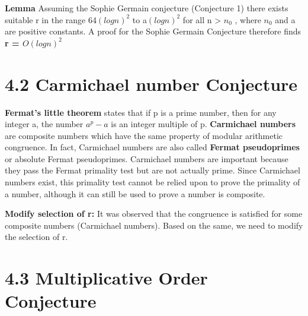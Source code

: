 \documentclass[a4paper,12pt]{article}
\begin{document}
\begin{flushleft}
	\textbf{Lemma} Assuming the Sophie Germain conjecture (Conjecture 1) there exists suitable r in the range 64\((log n)^2\) to a\((log n)^2\) for all n > \(n_{ 0}\) , where \(n_{ 0}\) and a are positive constants.
	\newline
	A proof for the Sophie Germain Conjecture therefore finds \textbf{r = \(O(log n)^2\)}
\end{flushleft}


\section*{\large 4.2 Carmichael number Conjecture}	

\begin{flushleft}

\textbf{Fermat's little theorem} states that if p is a prime number, then for any integer a, the number \(a^p-a\) is an integer multiple of p.
\vspace{0.1in}
\newline
\textbf{Carmichael numbers} are composite numbers which have the same property of modular arithmetic congruence. In fact, Carmichael numbers are also called \textbf{Fermat pseudoprimes} or absolute Fermat pseudoprimes.
\vspace{0.1in} 
\newline
Carmichael numbers are important because they pass the Fermat primality test but are not actually prime. Since Carmichael numbers exist, this primality test cannot be relied upon to prove the primality of a number, although it can still be used to prove a number is composite.

\vspace{0.1in} 

\textbf{Modify selection of r:} It was observed that the congruence is satisfied for some composite numbers (Carmichael numbers). Based on the same, we need to modify the selection of r.
\end{flushleft}

\section*{\large 4.3 Multiplicative Order Conjecture}	
\end{document}
